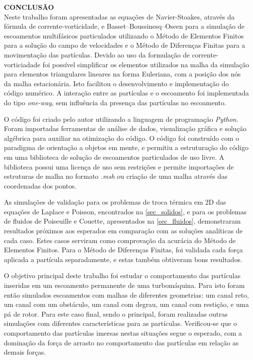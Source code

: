 \noindent\textbf{CONCLUSÃO}
\\

Neste trabalho foram apresentadas as equações de Navier-Stoakes, através da fórmula de corrente-vorticidade, e Basset–Boussinesq–Oseen para a simulação de escoamentos multifásicos particulados utilizando o Método de Elementos Finitos para a solução do campo de velocidades e o Método de Diferenças Finitas para a movimentação das partículas.
Devido ao uso da formulação de corrente-vorticiadade foi possível simplificar os elementos utilizados na malha da simulação para elementos triangulares lineares na forma Euleriana, com a posição dos nós da malha estacionária.
Isto facilitou o desenvolvimento e implementação do código numérico.
A interação entre as partículas e o escoamento foi implementada do tipo \textit{one-way}, sem influência da presença das partículas no escoamento.

O código foi criado pelo autor utilizando a linguagem de programação \textit{Python}.
Foram importadas ferramentas de análise de dados, visualização gráfica e solução algébrica para auxiliar na otimização do código.
O código foi construído com o paradigma de orientação a objetos em mente, e permitiu a estruturação do código em uma biblioteca de solução de escoamentos particulados de uso livre.
A biblioteca possui uma licença de uso sem restrições e permite importações de estruturas de malha no formato \textit{.msh} ou criação de uma malha através das coordenadas dos pontos.

As simulações de validação para os problemas de troca térmica em 2D das equações de Laplace e Poisson, encontrados na \ref{sec_solidos}, e para os problemas de fluidos de Poiseuille e Couette, apresentados na \ref{sec_fluidos}, demonstraram resultados próximos aos esperados em comparação com as soluções analíticas de cada caso.
Estes casos serviram como comprovação da acurácia do Método de Elementos Finitos.
Para o Método de Diferenças Finitas, foi validada cada força aplicada a partícula separadamente, e estas também obtiveram bons resultados.

O objetivo principal deste trabalho foi estudar o comportamento das partículas inseridas em um escoamento permanente de uma turbomáquina.
Para isto foram então simulados escoamentos com malhas de diferentes geometrias: um canal reto, um canal com um obstáculo, um canal com degrau, um canal com restição, e uma pá de rotor.
Para este caso final, sendo o principal, foram realizadas outras simulações com diferentes características para as partículas.
Verificou-se que o comportamento das partículas imersas nestas situações segue o esperado, com a dominação da força de arrasto no comportamento das partículas em relação as demais forças.

